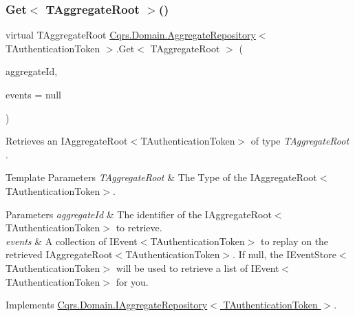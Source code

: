 \subsubsection{\texorpdfstring{Get$<$ T\+Aggregate\+Root $>$()}{Get< TAggregateRoot >()}}
{\footnotesize\ttfamily virtual T\+Aggregate\+Root \hyperlink{classCqrs_1_1Domain_1_1AggregateRepository}{Cqrs.\+Domain.\+Aggregate\+Repository}$<$ T\+Authentication\+Token $>$.Get$<$ T\+Aggregate\+Root $>$ (\begin{DoxyParamCaption}\item[{Guid}]{aggregate\+Id,  }\item[{I\+List$<$ \hyperlink{interfaceCqrs_1_1Events_1_1IEvent}{I\+Event}$<$ T\+Authentication\+Token $>$$>$}]{events = {\ttfamily null} }\end{DoxyParamCaption})\hspace{0.3cm}{\ttfamily [virtual]}}



Retrieves an I\+Aggregate\+Root$<$\+T\+Authentication\+Token$>$ of type {\itshape T\+Aggregate\+Root} . 


\begin{DoxyTemplParams}{Template Parameters}
{\em T\+Aggregate\+Root} & The Type of the I\+Aggregate\+Root$<$\+T\+Authentication\+Token$>$.\\
\hline
\end{DoxyTemplParams}

\begin{DoxyParams}{Parameters}
{\em aggregate\+Id} & The identifier of the I\+Aggregate\+Root$<$\+T\+Authentication\+Token$>$ to retrieve.\\
\hline
{\em events} & A collection of I\+Event$<$\+T\+Authentication\+Token$>$ to replay on the retrieved I\+Aggregate\+Root$<$\+T\+Authentication\+Token$>$. If null, the I\+Event\+Store$<$\+T\+Authentication\+Token$>$ will be used to retrieve a list of I\+Event$<$\+T\+Authentication\+Token$>$ for you. \\
\hline
\end{DoxyParams}


Implements \hyperlink{interfaceCqrs_1_1Domain_1_1IAggregateRepository_a890633fddbd05bd3b9e9968a2de095bb_a890633fddbd05bd3b9e9968a2de095bb}{Cqrs.\+Domain.\+I\+Aggregate\+Repository$<$ T\+Authentication\+Token $>$}.

